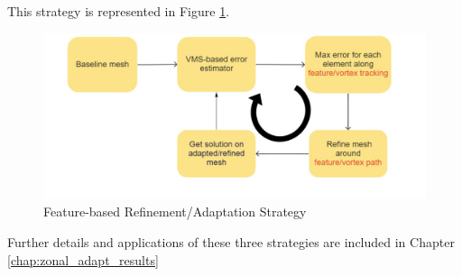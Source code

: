 This strategy is represented in Figure \ref{fig:feature_based_strat}.

\begin{figure}[H]
	\centering
	\includegraphics[width=1\textwidth]{figures/adapt_strat/feature_based.png}
	\caption{Feature-based Refinement/Adaptation Strategy}
	\label{fig:feature_based_strat}
\end{figure}

Further details and applications of these three strategies are included in Chapter \ref{chap:zonal_adapt_results}




